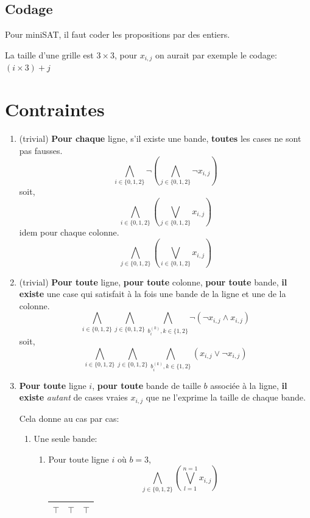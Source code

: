 \documentclass[a4paper,12pt]{report}
\begin{document}
\subsection{Codage}
Pour miniSAT, il faut coder les propositions par des entiers.


La taille d'une grille est $3\times3$, pour $x_{i,j}$ on aurait par exemple le codage: $(i \times 3)+ j$


\section{Contraintes}
\begin{enumerate}

\item (trivial) \textbf{Pour chaque} ligne, s'il existe une bande, \textbf{toutes} les cases ne sont pas fausses.
$$ \bigwedge_{i \in \{0,1,2\}} \lnot \left( \bigwedge_{j \in \{0,1,2\}} \lnot x_{i,j} \right) $$
soit,
$$ \bigwedge_{i \in \{0,1,2\}} \left( \bigvee_{j \in \{0,1,2\}} x_{i,j} \right) $$
idem pour chaque colonne.
$$ \bigwedge_{j \in \{0,1,2\}} \left( \bigvee_{i \in \{0,1,2\}} x_{i,j} \right) $$

\item (trivial) \textbf{Pour toute} ligne, \textbf{pour toute} colonne, \textbf{pour toute} bande, \textbf{il existe} une case qui satisfait à la fois une bande de la ligne et une de la colonne.
$$\bigwedge_{i \in \{0,1,2\}} \bigwedge_{j \in \{0,1,2\}} \bigwedge_{b_i^{(k)}, k\in\{1,2\}} 
\lnot \left(
	\lnot x_{i,j} \wedge x_{i,j}
\right)$$
soit,
$$\bigwedge_{i \in \{0,1,2\}} \bigwedge_{j \in \{0,1,2\}} \bigwedge_{b_i^{(k)}, k\in\{1,2\}} 
\left(
	x_{i,j} \vee \lnot x_{i,j}
\right)$$

\item \textbf{Pour toute} ligne $i$, \textbf{pour toute} bande de taille $b$ associée à la ligne, \textbf{il existe} \textit{autant} de cases vraies $x_{i,j}$ que ne l'exprime la taille de chaque bande. 

Cela donne au cas par cas:
	\begin{enumerate}
		\item Une seule bande: 
		\begin{enumerate}
			\item Pour toute ligne $i$ où $b=3$, 
			$$\bigwedge_{j\in\{0,1,2\}}\left( \bigvee_{l=1}^{n=1} x_{i,j} \right)$$
			\begin{center}						
			\begin{tabular}{|c|c|c|}
			\hline 
			$\top$ & $\top$  & $\top$  \\ 
			\hline  
			\end{tabular}
			\end{center}


\end{enumerate}
\end{enumerate}
\end{enumerate}
\end{document}
